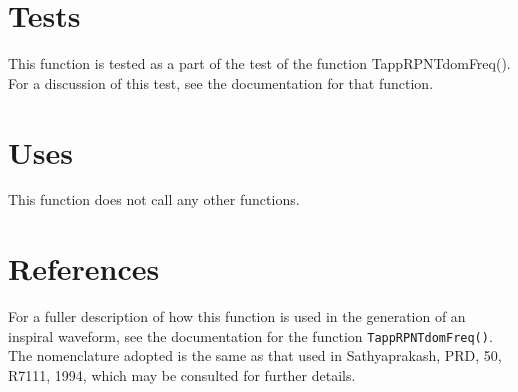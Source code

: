 \documentclass[12pt]{article}
\begin{document}
\section{Tests}

This function is tested as a part of the test of the function TappRPNTdomFreq(). For a discussion of this test, see the documentation for that function.

\section{Uses}

This function does not call any other functions.


\section{References}
For a fuller description of how this function is used in the generation of an inspiral waveform, see the documentation for the function \texttt{TappRPNTdomFreq()}.
The nomenclature adopted is the same as that used in Sathyaprakash, PRD, 50, R7111, 1994, which may be consulted for further details.
\end{document}
